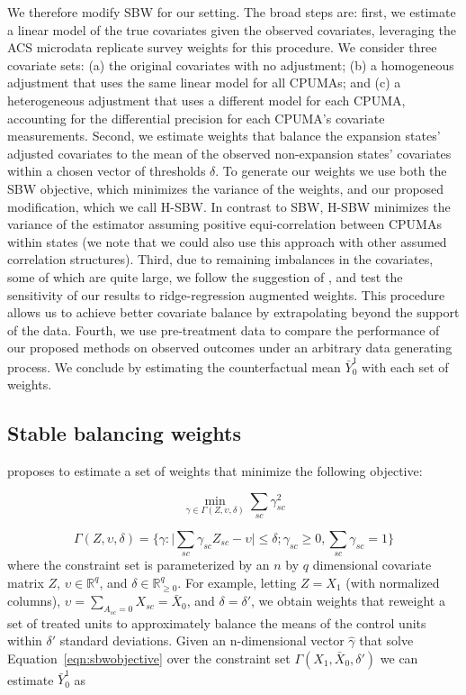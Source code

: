 \documentclass[aoas]{imsart}
\theoremstyle{plain}
\theoremstyle{remark}
\begin{document}
We therefore modify SBW for our setting. The broad steps are: first, we estimate a linear model of the true covariates given the observed covariates, leveraging the ACS microdata replicate survey weights for this procedure. We consider three covariate sets: (a) the original covariates with no adjustment; (b) a homogeneous adjustment that uses the same linear model for all CPUMAs; and (c) a heterogeneous adjustment that uses a different model for each CPUMA, accounting for the differential precision for each CPUMA's covariate measurements. Second, we estimate weights that balance the expansion states' adjusted covariates to the mean of the observed non-expansion states' covariates within a chosen vector of thresholds $\delta$. To generate our weights we use both the SBW objective, which minimizes the variance of the weights, and our proposed modification, which we call H-SBW. In contrast to SBW, H-SBW minimizes the variance of the estimator assuming positive equi-correlation between CPUMAs within states (we note that we could also use this approach with other assumed correlation structures). Third, due to remaining imbalances in the covariates, some of which are quite large, we follow the suggestion of \cite{ben2018augmented}, and test the sensitivity of our results to ridge-regression augmented weights. This procedure allows us to achieve better covariate balance by extrapolating beyond the support of the data. Fourth, we use pre-treatment data to compare the performance of our proposed methods on observed outcomes under an arbitrary data generating process. We conclude by estimating the counterfactual mean $\bar{Y}^1_0$ with each set of weights.

\subsection{Stable balancing weights}

\cite{zubizarreta2015stable} proposes to estimate a set of weights that minimize the following objective:

\begin{equation}\label{eqn:sbwobjective}
\min_{\gamma \in \Gamma(Z, \upsilon, \delta)} \sum_{sc}\gamma_{sc}^2
\end{equation}

\begin{equation}\label{eqn:constraint}
\Gamma(Z, \upsilon, \delta) = \{\gamma: \lvert \sum_{sc}\gamma_{sc} Z_{sc} - \upsilon \lvert \le \delta; \gamma_{sc} \ge 0, \sum_{sc}\gamma_{sc} = 1\}
\end{equation}
%
where the constraint set is parameterized by an $n$ by $q$ dimensional covariate matrix $Z$, $\upsilon \in \mathbb{R}^q$, and $\delta \in \mathbb{R}_{\ge 0}^q$. For example, letting $Z = X_1$ (with normalized columns), $\upsilon = \sum_{A_{sc} = 0}X_{sc} = \bar{X}_0$, and $\delta = \delta'$, we obtain weights that reweight a set of treated units to approximately balance the means of the control units within $\delta'$ standard deviations. Given an n-dimensional vector $\hat{\gamma}$ that solve Equation~\ref{eqn:sbwobjective} over the constraint set $\Gamma(X_1, \bar{X}_0, \delta')$ we can estimate $\bar{Y}_0^1$ as
\end{document}
